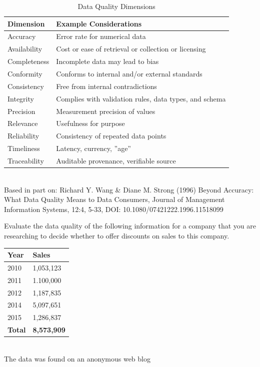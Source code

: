 \begin{table}[h]
\centering
\renewcommand{\arraystretch}{1.25}

\begin{tabular}{l|l} \hline
\textbf{Dimension} & \textbf{Example Considerations} \\ \hline \hline
Accuracy & Error rate for numerical data\\
Availability & Cost or ease of retrieval or collection or licensing \\
Completeness & Incomplete data may lead to bias \\
Conformity & Conforms to internal and/or external standards \\
Consistency & Free from internal contradictions \\
Integrity & Complies with validation rules, data types, and schema \\
Precision & Measurement precision of values \\
Relevance & Usefulness for purpose \\
Reliability & Consistency of repeated data points \\
Timeliness & Latency, currency, ''age'' \\
Traceability & Auditable provenance, verifiable source \\ \hline
\end{tabular} \\
\vspace{.5\baselineskip}
\footnotesize Based in part on: Richard Y. Wang \& Diane M. Strong (1996) Beyond Accuracy: What Data Quality Means to Data Consumers, Journal of Management Information Systems, 12:4, 5-33, DOI: 10.1080/07421222.1996.11518099 

\caption{Data Quality Dimensions}

\label{tab:dataquality}
\end{table}

\begin{exerciseboxpaper}
Evaluate the data quality of the following information for a company that you are researching to decide whether to offer discounts on sales to this company. \\
\vspace{.5\baselineskip}

\renewcommand{\arraystretch}{1.25}
\begin{tabular}{l|l} 
{\bf Year} & {\bf Sales} \\ \hline 
2010 & 1,053,123 \\ \hline
2011 & 1.100,000 \\ \hline
2012 & 1,187,835 \\ \hline
2014 & 5,097,651 \\ \hline
2015 & 1,286,837 \\ \hline 
{\bf Total} & {\bf 8,573,909} \\ 
\end{tabular} \\

\vspace{.5\baselineskip}
The data was found on an anonymous web blog
\end{exerciseboxpaper}


